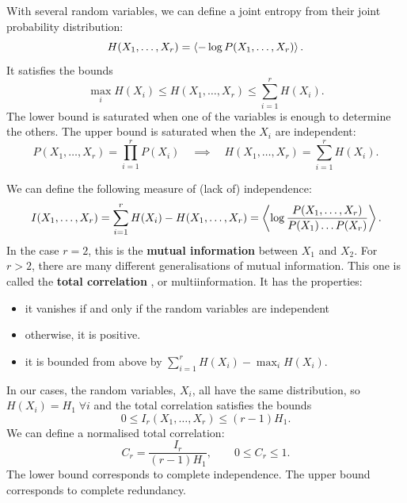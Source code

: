 \documentclass[12pt]{article}
\begin{document}
With several random variables, we can define a joint entropy from their joint probability distribution:
%
\begin{equation}\label{eq:jointent}
  H(X_1,\ldots,X_r) = \left\langle -\log P(X_1,\ldots,X_r) \right\rangle.
\end{equation}
%
It satisfies the bounds
%
\begin{equation}\label{eq:entbounds}
  \max_i H(X_i) \leq H(X_1,\ldots,X_r) \leq \sum_{i=1}^r H(X_i).
\end{equation}
%
The lower bound is saturated when one of the variables is enough to determine the others. The upper bound is saturated when the $X_i$ are independent:
%
\begin{equation}\label{eq:indent}
  P(X_1,\ldots,X_r) = \prod_{i=1}^r P(X_i)
  \quad \implies \quad
  H(X_1,\ldots,X_r) = \sum_{i=1}^r H(X_i).
\end{equation}
%

We can define the following measure of (lack of) independence:
%
\begin{equation}\label{eq:mutinf}
  I(X_1,\ldots,X_r) = \sum_{i=1}^r H(X_i) - H(X_1,\ldots,X_r) = \left\langle  \log \frac{P(X_1,\ldots,X_r)}{P(X_1)\ldots P(X_r)}  \right\rangle.
\end{equation}
%
In the case $r=2$, this is the \textbf{mutual information} between $X_1$ and $X_2$. For $r>2$, there are many different generalisations of mutual information. This one is called the \textbf{total correlation} \cite{Watanabe:1960:ITA:1661258.1661265}, or multiinformation. It has the properties:
%
\begin{itemize}
  \item it vanishes if and only if the random variables are independent
  \item otherwise, it is positive.
  \item it is bounded from above by $\sum_{i=1}^r H(X_i) - \max_i H(X_i)$.
\end{itemize}
%

In our cases, the random variables, $X_i$, all have the same distribution, so $H(X_i)=H_1\; \forall i$ and the total correlation satisfies the bounds
%
\begin{equation}\label{eq:mutinfbounds}
  0 \leq I_r(X_1,\ldots,X_r) \leq (r-1)H_1.
\end{equation}
%
We can define a normalised total correlation:
%
\begin{equation}\label{eq:normmutinf}
  C_r = \frac{I_r}{(r-1)H_1}, \qquad 0 \leq C_r \leq 1.
\end{equation}
%
The lower bound corresponds to complete independence. The upper bound corresponds to complete redundancy.
\end{document}
